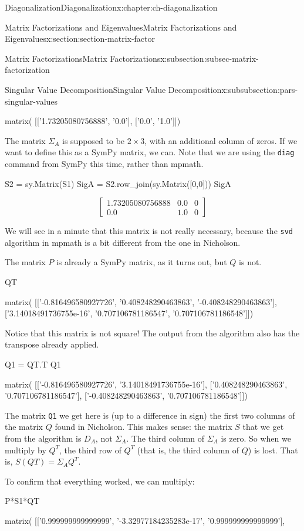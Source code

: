 \documentclass[oneside,10pt,]{book}
\newcommand{\mono}[1]{\texttt{#1}}
\numberwithin{equation}{section}
\newcommand{\bbm}{\begin{bmatrix}}
\newcommand{\ebm}{\end{bmatrix}}
\newcommand{\amp}{&}
\begin{document}
\begin{chapterptx}{Diagonalization}{}{Diagonalization}{}{}{x:chapter:ch-diagonalization}
\begin{sectionptx}{Matrix Factorizations and Eigenvalues}{}{Matrix Factorizations and Eigenvalues}{}{}{x:section:section-matrix-factor}
\begin{subsectionptx}{Matrix Factorizations}{}{Matrix Factorizations}{}{}{x:subsection:subsec-matrix-factorization}
\begin{subsubsectionptx}{Singular Value Decomposition}{}{Singular Value Decomposition}{}{}{x:subsubsection:pars-singular-values}
\begin{sageoutput}
matrix(
[['1.73205080756888', '0.0'],
 ['0.0', '1.0']])
\end{sageoutput}
The matrix \(\Sigma_A\) is supposed to be \(2\times 3\), with an additional column of zeros. If we want to define this as a SymPy matrix, we can. Note that we are using the \mono{diag} command from SymPy this time, rather than mpmath.%
\begin{sageinput}
S2 = sy.Matrix(S1)
SigA = S2.row_join(sy.Matrix([0,0]))
SigA
\end{sageinput}
\begin{sageoutput}
\[\bbm 1.73205080756888 \amp 0.0 \amp 0\\ 0.0 \amp 1.0 \amp 0\ebm\]
\end{sageoutput}
We will see in a minute that this matrix is not really necessary, because the \mono{svd} algorithm in mpmath is a bit different from the one in Nicholson.%
\par
The matrix \(P\) is already a SymPy matrix, as it turns out, but \(Q\) is not.%
\begin{sageinput}
QT
\end{sageinput}
\begin{sageoutput}
matrix(
[['-0.816496580927726', '0.408248290463863', '-0.408248290463863'],
 ['3.14018491736755e-16', '0.707106781186547', '0.707106781186548']])
\end{sageoutput}
Notice that this matrix is not square! The output from the algorithm also has the transpose already applied.%
\begin{sageinput}
Q1 = QT.T
Q1
\end{sageinput}
\begin{sageoutput}
matrix(
[['-0.816496580927726', '3.14018491736755e-16'],
 ['0.408248290463863', '0.707106781186547'],
 ['-0.408248290463863', '0.707106781186548']])
\end{sageoutput}
The matrix \mono{Q1} we get here is (up to a difference in sign) the first two columns of the matrix \(Q\) found in Nicholson. This makes sense: the matrix \(S\) that we get from the algorithm is \(D_A\), not \(\Sigma_A\). The third column of \(\Sigma_A\) is zero. So when we multiply by \(Q^T\), the third row of \(Q^T\) (that is, the third column of \(Q\)) is lost. That is, \(S(QT)=\Sigma_AQ^T\).%
\par
To confirm that everything worked, we can multiply:%
\begin{sageinput}
P*S1*QT
\end{sageinput}
\begin{sageoutput}
matrix(
[['0.999999999999999', '-3.32977184235283e-17', '0.999999999999999'],

\end{sageoutput}
\end{subsubsectionptx}
\end{subsectionptx}
\end{sectionptx}
\end{chapterptx}
\end{document}
